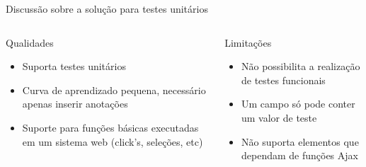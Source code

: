 \documentclass{beamer}
\begin{document}
\begin{frame}{Discussão sobre a solução para testes unitários}
     \begin{columns}[T] %
     \begin{column}[T]{5cm} %
        \begin{block}{Qualidades}
    	    \begin{itemize}
        		\item Suporta testes unitários
        		\item Curva de aprendizado pequena, necessário apenas inserir anotações
        		\item Suporte para funções básicas executadas em um sistema web (click's, seleções, etc)
        	\end{itemize}
    	\end{block}
     \end{column}
     \begin{column}[T]{5cm} %
        \begin{alertblock}{Limitações}
            \begin{itemize}
            	\item Não possibilita a realização de testes funcionais
            	\item Um campo só pode conter um valor de teste
            	\item Não suporta elementos que dependam de funções Ajax
            \end{itemize}
        \end{alertblock}
     \end{column}
     \end{columns}
\end{frame}
\end{document}
